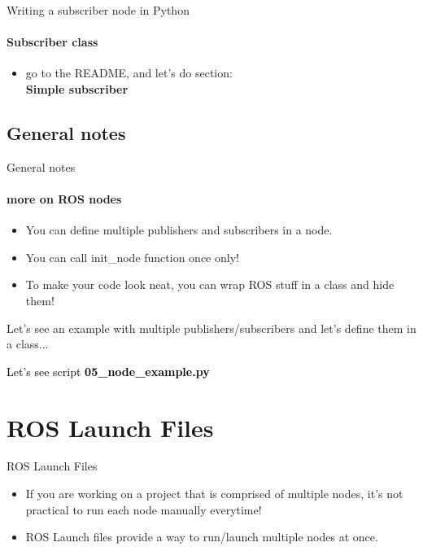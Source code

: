 \documentclass{beamer}
\begin{document}
\begin{frame}[fragile]{Writing a subscriber node in Python}
    \framesubtitle{Subscriber class}
    
    
    \begin{itemize}
        \centering
        \item go to the README, and let's do section:\\ 
        \textbf{Simple subscriber}
    \end{itemize} 
\end{frame}


\subsection{General notes}
\begin{frame}{General notes}
    \framesubtitle{more on ROS nodes}
    \begin{itemize}
        \item You can define multiple publishers and subscribers in a node.
        \item You can call {\ttfamily \colorbox{gray!30!white}{init\_node}} function once only!
        \item To make your code look neat, you can wrap ROS stuff in a class and hide them!
    \end{itemize} 
    \vspace{0.5cm}
    Let's see an example with multiple publishers/subscribers and let's define them in a class...
\end{frame}


\begin{frame}[plain]{}  
    \centering
    {\huge \textcolor{black}{Let's see script \textbf{05\_node\_example.py}}}
\end{frame}




\section{ROS Launch Files}

\begin{frame}{ROS Launch Files}
    \begin{itemize}
        \item If you are working on a project that is comprised of multiple nodes, it's not practical to run each node manually everytime!
        \vspace{0.4cm}
        \item ROS Launch files provide a way to run/launch multiple nodes at once.
         
    \end{itemize}  
\end{frame}
\end{document}
